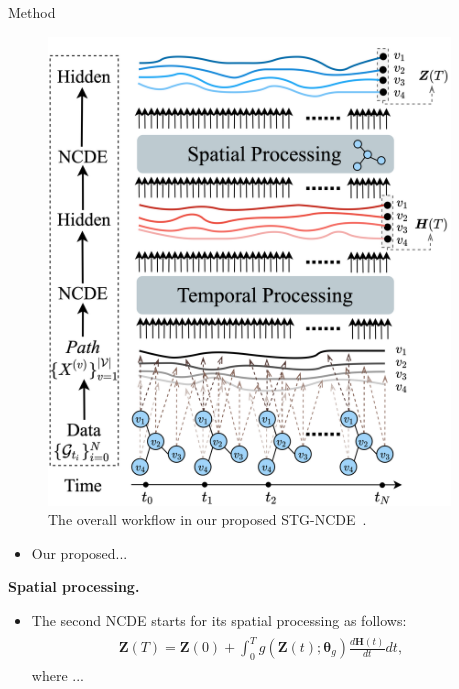 \documentclass[final,hyperref={pdfpagelabels=false}]{beamer}
\begin{document}
\begin{frame}[t]
\begin{columns}[t]
\begin{column}{.3\textwidth}
    \begin{block}{Method}
        \begin{figure}[t]
            \centering
            \includegraphics[width=0.6\columnwidth]{img/stgncde_tranparent.png}
            \caption{The overall workflow in our proposed STG-NCDE~\cite{choi2022STGNCDE}.}
            \label{fig:stgncde}
        \end{figure}
        \begin{itemize}
            \item Our proposed...
        \end{itemize}
        \textbf{Spatial processing.}
        \begin{itemize}
        \item The second NCDE starts for its spatial processing as follows:
            \begin{align}\begin{split}
                \bm{Z}(T) = \bm{Z}(0) + \int_{0}^{T} g(\bm{Z}(t);\bm{\theta}_g) \frac{d\bm{H}(t)}{dt} dt,\label{eq:type2}
            \end{split}\end{align}
            where ...
        \end{itemize}
    \end{block}
    

  \end{column} %


  \begin{column}{.02\textwidth}\end{column} %


\end{columns}
\end{frame}
\end{document}
